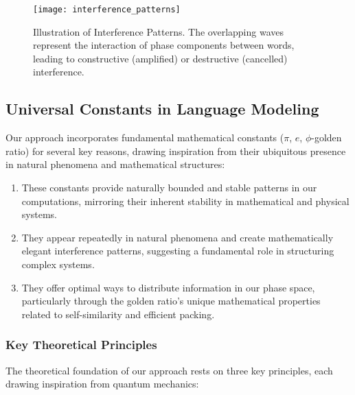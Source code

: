 \documentclass[twocolumn]{article}
\begin{document}
\begin{figure}[h]
    \centering
    \texttt{[image: interference\_patterns]}
    \caption{Illustration of Interference Patterns. The overlapping waves represent the interaction of phase components between words, leading to constructive (amplified) or destructive (cancelled) interference.}
\end{figure}

\subsection{Universal Constants in Language Modeling}
Our approach incorporates fundamental mathematical constants ($\pi$, $e$, $\phi$-golden ratio) for several key reasons, drawing inspiration from their ubiquitous presence in natural phenomena and mathematical structures:
\begin{enumerate}
    \item These constants provide naturally bounded and stable patterns in our computations, mirroring their inherent stability in mathematical and physical systems.
    \item They appear repeatedly in natural phenomena and create mathematically elegant interference patterns, suggesting a fundamental role in structuring complex systems.
    \item They offer optimal ways to distribute information in our phase space, particularly through the golden ratio's unique mathematical properties related to self-similarity and efficient packing.
\end{enumerate}

\subsubsection{Key Theoretical Principles}
The theoretical foundation of our approach rests on three key principles, each drawing inspiration from quantum mechanics:
\end{document}
